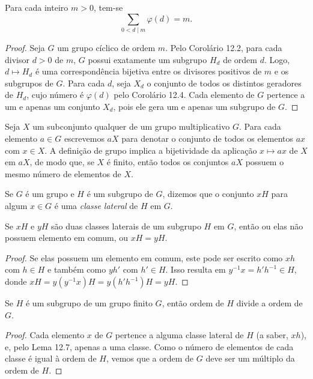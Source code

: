 \begin{corolario}
Para cada inteiro $m > 0$, tem-se
\[
\sum_{0 < d \mid m} \varphi(d) = m.
\]
\end{corolario}

\begin{proof}
Seja $G$ um grupo cíclico de ordem $m$. Pelo Corolário 12.2, para cada divisor $d > 0$ de $m$, $G$ possui exatamente um 
subgrupo $H_d$ de ordem $d$. Logo, $d \longmapsto H_d$ é uma correspondência bijetiva entre os divisores positivos de $m$ 
e os subgrupos de $G$. Para cada $d$, seja $X_d$ o conjunto de todos os distintos geradores de $H_d$, cujo número é 
$\varphi(d)$ pelo Corolário 12.4. Cada elemento de $G$ pertence a um e apenas um conjunto $X_d$, pois ele gera um e apenas 
um subgrupo de $G$.
\end{proof}

Seja $X$ um subconjunto qualquer de um grupo multiplicativo $G$. Para cada elemento $a \in G$ escrevemos $aX$ para denotar 
o conjunto de todos os elementos $ax$ com $x \in X$. A definição de grupo implica a bijetividade da aplicação $x \longmapsto ax$ 
de $X$ em $aX$, de modo que, se $X$ é finito, então todos os conjuntos $aX$ possuem o mesmo número de  elementos de $X$.

\begin{definicao}
Se $G$ é um grupo e $H$ é um subgrupo de $G$, dizemos que o conjunto $xH$ para algum $x \in G$ é uma \emph{classe lateral} 
de $H$ em $G$.
\end{definicao}

\begin{lema}
Se $xH$ e $yH$ são duas classes laterais de um subgrupo $H$ em $G$, então ou elas não possuem elemento em comum, ou $xH = yH$.
\end{lema}

\begin{proof}
Se elas possuem um elemento em comum, este pode ser escrito como $xh$ com $h \in H$ e também como $yh'$ com $h' \in H$. 
Isso resulta em $y^{-1}x = h'h^{-1} \in H$, donde $xH = y(y^{-1}x)H = y(h'h^{-1})H = yH$.
\end{proof}

\begin{teorema}
Se $H$ é um subgrupo de um grupo finito $G$, então ordem de $H$ divide a ordem de $G$.
\end{teorema}

\begin{proof}
Cada elemento $x$ de $G$ pertence a alguma classe lateral de $H$ (a saber, $xh$), e, pelo Lema 12.7, apenas a uma classe.
Como o número de elementos de cada classe é igual à ordem de $H$, vemos que a ordem de $G$ deve ser um múltiplo da ordem de 
$H$. 
\end{proof}

